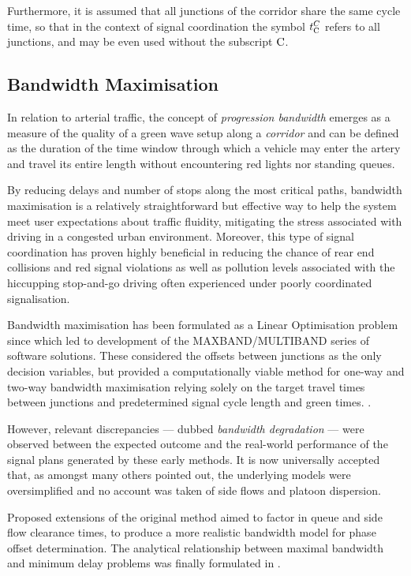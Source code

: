 Furthermore, it is assumed that all junctions of the corridor share the same cycle time, so that in the context of signal coordination the symbol $t_{\mathrm{C}}^C$ refers to all junctions, and may be even used without the subscript $\mathrm{C}$.


\subsection{Bandwidth Maximisation} \label{s:bandmax}
In relation to arterial traffic, the concept of \emph{progression bandwidth} emerges as a measure of the quality of a green wave setup along a \emph{corridor} and can be defined as the duration of the time window through which a vehicle may enter the artery and travel its entire length without encountering red lights nor standing queues.

By reducing delays and number of stops along the most critical paths, bandwidth maximisation is a relatively straightforward but effective way to help the system meet user expectations about traffic fluidity, mitigating the stress associated with driving in a congested urban environment. Moreover, this type of signal coordination has proven highly beneficial in reducing the chance of rear end collisions and red signal violations  as well as pollution levels associated with the hiccupping stop-and-go driving often experienced under poorly coordinated signalisation.

Bandwidth maximisation has been formulated as a Linear Optimisation problem since  which led to development of the MAXBAND/MULTIBAND series of software solutions. These considered the offsets between junctions as the only decision variables, but provided a computationally viable method for one-way and two-way bandwidth maximisation relying solely on the target travel times between junctions and predetermined signal cycle length and green times. .

However, relevant discrepancies — dubbed \emph{bandwidth degradation} — were observed between the expected outcome and the real-world performance of the signal plans generated by these early methods. It is now universally accepted that, as  amongst many others pointed out, the underlying models were oversimplified and no account was taken of side flows and platoon dispersion. 

Proposed extensions of the original method aimed to factor in queue and side flow clearance times, to produce a more realistic bandwidth model for phase offset determination. The analytical relationship between maximal bandwidth and minimum delay problems was finally formulated in .

